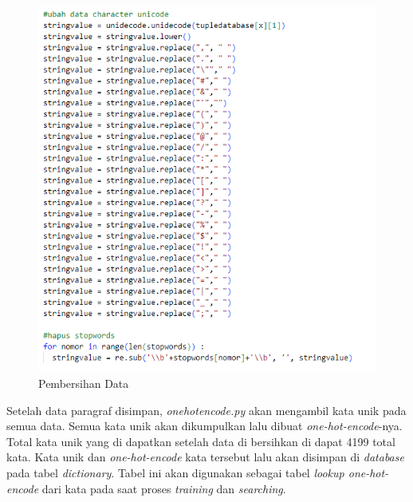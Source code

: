 \documentclass[12pt]{report}
\begin{document}
\begin{figure}[H]
\centering
\includegraphics[scale=0.75]{pembersihan_data}
\caption{Pembersihan Data}
\label{pembersihandata}
\end{figure}

Setelah data paragraf disimpan, \textit{onehotencode.py} akan mengambil kata unik pada semua data. Semua kata unik akan dikumpulkan lalu dibuat \textit{one-hot-encode}-nya. Total kata unik yang di dapatkan setelah data di bersihkan di dapat 4199 total kata. Kata unik dan \textit{one-hot-encode} kata tersebut lalu akan disimpan di \textit{database} pada tabel \textit{dictionary}. Tabel ini akan digunakan sebagai tabel \textit{lookup one-hot-encode} dari kata pada saat proses \textit{training} dan \textit{searching}.
\end{document}
